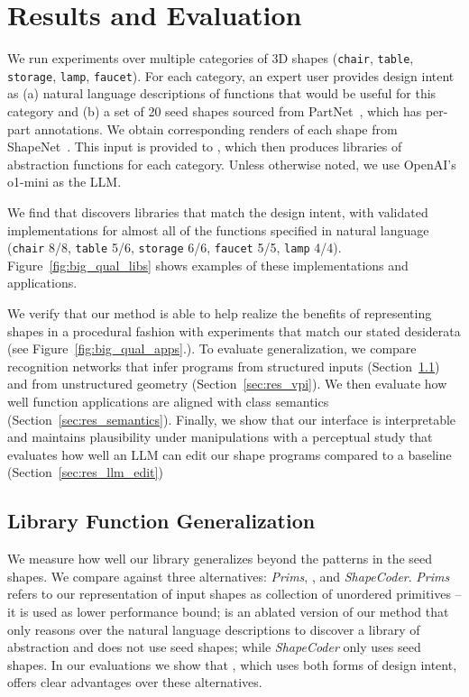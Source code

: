 
\section{Results and Evaluation}
\label{sec:results}

We run experiments over multiple categories of 3D shapes (\texttt{chair}, \texttt{table}, \texttt{storage}, \texttt{lamp}, \texttt{faucet}).
For each category, an expert user provides design intent as (a) natural language descriptions of functions that would be useful for this category and
(b) a set of 20 seed shapes 
sourced from PartNet~\cite{PartNet}, which has per-part annotations. 
We obtain corresponding renders of each shape from ShapeNet~\cite{chang2015shapenet}.
This input is provided to \methodname, which then produces libraries of abstraction functions for each category.
Unless otherwise noted, we use
OpenAI's o1-mini as the LLM.

We find that \methodname discovers libraries that match the design intent, with validated implementations for almost all of the functions specified in natural language (\texttt{chair} 8/8, \texttt{table} 5/6, \texttt{storage} 6/6, \texttt{faucet} 5/5, \texttt{lamp} 4/4). 
Figure~\ref{fig:big_qual_libs} shows examples of these implementations and applications.

We verify that our method is able to help realize the benefits of representing shapes in a procedural fashion with experiments that match our stated desiderata (see Figure~\ref{fig:big_qual_apps}.).
To evaluate generalization, we compare recognition networks that infer programs from structured inputs (Section~\ref{sec:res_prog_compression}) and from unstructured geometry (Section~\ref{sec:res_vpi}).
We then evaluate how well function applications are aligned with class semantics (Section~\ref{sec:res_semantics}).
Finally, we show that our interface is interpretable and maintains plausibility under manipulations with a perceptual study that evaluates how well an LLM can edit our shape programs compared to a baseline (Section~\ref{sec:res_llm_edit})


\subsection{Library Function Generalization}
\label{sec:res_prog_compression}



We measure how well our library generalizes beyond the patterns in the seed shapes.
We compare against three alternatives: \emph{Prims}, \emph{\llmbaseline}, and \emph{ShapeCoder}. 
\emph{Prims} refers to our representation of input shapes as collection of unordered primitives -- it is used as lower performance bound; 
\emph{\llmbaseline} is an ablated version of our method that only reasons over the natural language descriptions to discover a library of abstraction and does not use seed shapes; while \emph{ShapeCoder} only uses seed shapes.
In our evaluations we show that \methodname, which uses both forms of design intent, offers clear advantages over these alternatives.


